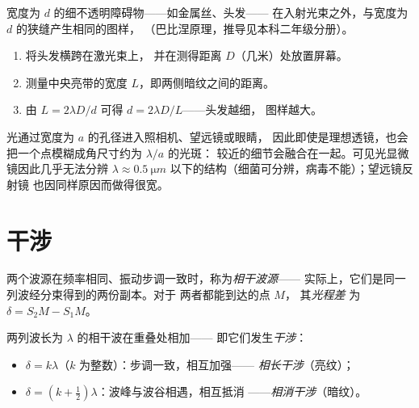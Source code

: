 \begin{proposition}[障碍物的衍射如同狭缝]\label{prop:g12:light-as-wave:hair}
宽度为 $d$ 的细不透明障碍物——如金属丝、头发——
在入射光束之外，与宽度为 $d$ 的狭缝产生相同的图样，
（巴比涅原理，推导见本科二年级分册）。
\end{proposition}
\admitted

\begin{method}[测量微小宽度]\label{met:g12:light-as-wave:hairwidth}
\begin{enumerate}
  \item 将头发横跨在激光束上，
        并在测得距离 $D$（几米）处放置屏幕。
  \item 测量中央亮带的宽度 $L$，即两侧暗纹之间的距离。
  \item 由 $L = 2\lambda D/d$ 可得 $d = 2\lambda D/L$——头发越细，
        图样越大。
\end{enumerate}
\end{method}

\begin{remark}[衍射限制每一种仪器]\label{rem:g12:light-as-wave:limits}
光通过宽度为 $a$ 的孔径进入照相机、望远镜或眼睛，
因此即使是理想透镜，也会把一个点模糊成角尺寸约为 $\lambda/a$ 的光斑：
较近的细节会融合在一起。可见光显微镜因此几乎无法分辨
$\lambda \approx
\qty{0.5}{\micro m}$ 以下的结构（细菌可分辨，病毒不能）；望远镜反射镜
也因同样原因而做得很宽。
\end{remark}

\section{干涉}

\begin{definition}\label{def:g12:light-as-wave:coherent}
两个波源在频率相同、振动步调一致时，称为\emph{相干波源}——
实际上，它们是同一列波经分束得到的两份副本。对于
两者都能到达的点 $M$，
其\emph{光程差}%
为 $\delta = S_2M - S_1M$。
\end{definition}

\begin{proposition}[干涉条件]\label{prop:g12:light-as-wave:conditions}
两列波长为 $\lambda$ 的相干波在重叠处相加——
即它们发生\emph{干涉}：
\begin{itemize}
  \item $\delta = k\lambda$（$k$ 为整数）：步调一致，相互加强——
        \emph{相长干涉}（亮纹）；
  \item $\delta = (k + \tfrac12)\lambda$：波峰与波谷相遇，相互抵消
        ——\emph{相消干涉}（暗纹）。
\end{itemize}
\end{proposition}

